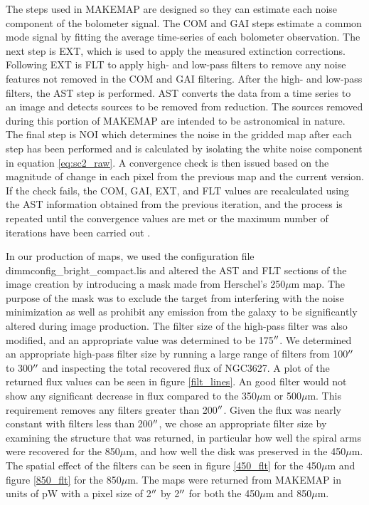 The steps used in MAKEMAP are designed so they can estimate each noise component of the bolometer signal.  The COM and GAI steps estimate a common mode signal by fitting the average time-series of each bolometer observation.  The next step is EXT, which is used to apply the measured extinction corrections.  Following EXT is FLT to apply high- and low-pass filters to remove any noise features not removed in the COM and GAI filtering.  After the high- and low-pass filters, the AST step is performed.  AST converts the data from a time series to an image and detects sources to be removed from reduction.  The sources removed during this portion of MAKEMAP are intended to be astronomical in nature.  The final step is NOI which determines the noise in the gridded map after each step has been performed and is calculated by isolating the white noise component in equation \ref{eq:sc2_raw}.  A convergence check is then issued based on the magnitude of change in each pixel from the previous map and the current version.  If the check fails, the COM, GAI, EXT, and FLT values are recalculated using the AST information obtained from the previous iteration, and the process is repeated until the convergence values are met or the maximum number of iterations have been carried out \citep{chapin2013}.

In our production of maps, we used the configuration file dimmconfig\_bright\_compact.lis and altered the AST and FLT sections of the image creation by introducing a mask made from Herschel's 250$\mu$m map.  The purpose of the mask was to exclude the target from interfering with the noise minimization as well as prohibit any emission from the galaxy to be significantly altered during image production.  The filter size of the high-pass filter was also modified, and an appropriate value was determined to be 175$\mbox{$^{\prime\prime}$}$.  We determined an appropriate high-pass filter size by running a large range of filters from 100$\mbox{$^{\prime\prime}$}$ to 300$\mbox{$^{\prime\prime}$}$ and inspecting the total recovered flux of NGC3627.  A plot of the returned flux values can be seen in figure \ref{filt_lines}.  An good filter would not show any significant decrease in flux compared to the 350$\mu$m or 500$\mu$m.  This requirement removes any filters greater than 200$\mbox{$^{\prime\prime}$}$.  Given the flux was nearly constant with filters less than 200$\mbox{$^{\prime\prime}$}$, we chose an appropriate filter size by examining the structure that was returned, in particular how well the spiral arms were recovered for the 850$\mu$m, and how well the disk was preserved in the 450$\mu$m.  The spatial effect of the filters can be seen in figure \ref{450_flt} for the 450$\mu$m and figure \ref{850_flt} for the 850$\mu$m.  The maps were returned from MAKEMAP in units of pW with a pixel size of 2$\mbox{$^{\prime\prime}$}$ by 2$\mbox{$^{\prime\prime}$}$ for both the 450$\mu$m and 850$\mu$m.


